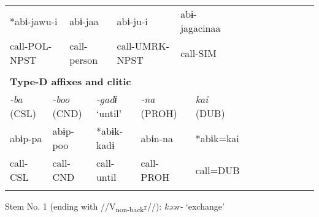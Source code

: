 \begin{tabularx}{\textwidth}{XXXXXXXXXXXXXXXXXXXXXX}
\multicolumn{3}{X}{{ *abɨ-jawu-i}} & \multicolumn{3}{X}{{ abɨ-jaa}} & \multicolumn{4}{X}{abɨ-ju-i} & \multicolumn{4}{X}{{ abɨ-jagacinaa}} & \multicolumn{8}{X}{}\\
\multicolumn{3}{X}{call-POL-NPST} & \multicolumn{3}{X}{call-person} & \multicolumn{4}{X}{call-UMRK-NPST} & \multicolumn{4}{X}{call-SIM} & \multicolumn{8}{X}{}\\
\multicolumn{22}{X}{}\\
\multicolumn{22}{X}{{\bfseries Type-D affixes and clitic}}\\
\multicolumn{2}{X}{{ \textit{{}-ba} (CSL)}} & \multicolumn{3}{X}{{ \textit{{}-boo} (CND)}} & \multicolumn{2}{X}{{ \textit{{}-gadɨ} ‘until’}} & \multicolumn{4}{X}{{ \textit{{}-na} (PROH)}} & \multicolumn{4}{X}{{ \textit{kai} (DUB)}} & \multicolumn{7}{X}{}\\
\multicolumn{2}{X}{{ abɨp-pa}} & \multicolumn{3}{X}{{ abɨp-poo}} & \multicolumn{2}{X}{{ *abɨk-kadɨ}} & \multicolumn{4}{X}{{ abɨn-na}} & \multicolumn{4}{X}{{ *abɨk=kai}} & \multicolumn{7}{X}{}\\
\multicolumn{2}{X}{call-CSL} & \multicolumn{3}{X}{call-CND} & \multicolumn{2}{X}{call-until} & \multicolumn{4}{X}{call-PROH} & \multicolumn{4}{X}{call=DUB} & \multicolumn{7}{X}{}\\
\lspbottomrule
\end{tabularx}
Stem No. 1 (ending with //V\textsubscript{non-back}r//): \textit{kəər-} ‘exchange’

\tablefirsthead{}

